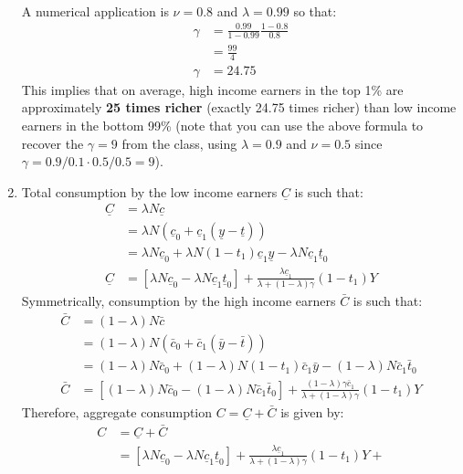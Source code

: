 \documentclass[]{book}
\theoremstyle{definition}
\theoremstyle{definition}
\theoremstyle{definition}
\theoremstyle{remark}
\begin{document}
\begin{enumerate}
\[\begin{aligned}
  \end{aligned}
  \] A numerical application is \(\nu=0.8\) and \(\lambda = 0.99\) so
  that: \[
  \begin{aligned}
  \gamma &= \frac{0.99}{1-0.99}\frac{1-0.8}{0.8}\\
   &= \frac{99}{4} \\
  \gamma &= 24.75
  \end{aligned}
  \] This implies that on average, high income earners in the top 1\%
  are approximately \textbf{25 times richer} (exactly 24.75 times
  richer) than low income earners in the bottom 99\% (note that you can
  use the above formula to recover the \(\gamma = 9\) from the class,
  using \(\lambda = 0.9\) and \(\nu = 0.5\) since
  \(\gamma = 0.9/0.1 \cdot0.5/0.5 = 9\)).
\item
  Total consumption by the low income earners \(\underline{C}\) is such
  that: \[
  \begin{aligned}
  \underline{C}&=\lambda N \underline{c}\\
  &=\lambda N \left(\underline{c}_{0}+\underline{c}_{1}(\underline{y}-\underline{t})\right)\\
  &=\lambda N  \underline{c}_{0} + \lambda N  (1-t_1) \underline{c}_{1}\underline{y}-\lambda N  \underline{c}_{1} \underline{t}_0\\
  \underline{C}&=\left[\lambda N  \underline{c}_{0}-\lambda  N \underline{c}_{1} \underline{t}_0 \right]+ \frac{\lambda \underline{c}_{1}}{\lambda+(1-\lambda)\gamma}(1-t_1)Y
  \end{aligned}
  \] Symmetrically, consumption by the high income earners \(\bar{C}\)
  is such that: \[
  \begin{aligned}
  \bar{C}&=(1-\lambda) N \bar{c}\\
  &=(1-\lambda) N \left(\bar{c}_{0}+\bar{c}_{1}(\bar{y}-\bar{t})\right)\\
  &=(1-\lambda) N  \bar{c}_{0} + (1-\lambda) N (1-t_1) \bar{c}_{1}\bar{y}-(1-\lambda) N  \bar{c}_{1} \bar{t}_0\\
  \bar{C}&=\left[(1-\lambda) N  \bar{c}_{0}-(1-\lambda) N  \bar{c}_{1} \bar{t}_0\right] + \frac{(1-\lambda) \gamma\bar{c}_{1}}{\lambda+(1-\lambda)\gamma}(1-t_1)Y
  \end{aligned}
  \] Therefore, aggregate consumption \(C=\underline{C} + \bar{C}\) is
  given by: \[
  \begin{aligned}
  C&=\underline{C} + \bar{C}\\
  &=\left[\lambda N  \underline{c}_{0}-\lambda  N \underline{c}_{1} \underline{t}_0 \right]+ \frac{\lambda \underline{c}_{1}}{\lambda+(1-\lambda)\gamma}(1-t_1)Y + 

\end{aligned}\]
\end{enumerate}
\end{document}
